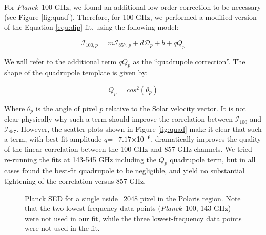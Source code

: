 \documentclass{emulateapj}
\newcommand{\PLANCK}{{\it Planck}}
\begin{document}
For \PLANCK~100 GHz, we found an additional low-order correction to be
necessary (see Figure \ref{fig:quad}). Therefore, for 100 GHz, we performed a 
modified version of the Equation \ref{equ:dip} fit, using the following model:

\begin{equation} \label{equ:quad}
\mathcal{I}_{100, p} = m\mathcal{I}_{857, p} + d\mathcal{D}_p + b + qQ_p
\end{equation}

We will refer to the additional term $qQ_p$ as the ``quadrupole correction''. 
The shape of the quadrupole template is given by:

\begin{equation}
Q_p = cos^2(\theta_p)
\end{equation}

Where $\theta_p$ is the angle of pixel $p$ relative to the Solar velocity 
vector. It is not clear physically why such a term should improve the 
correlation between $\mathcal{I}_{100}$ and $\mathcal{I}_{857}$. However, the 
scatter plots shown in Figure \ref{fig:quad} make it clear that such a term, 
with best-fit amplitude $q$=$-7.17$$\times$10$^{-6}$, dramatically improves the
quality of the linear correlation between the 100 GHz and 857 GHz channels. We 
tried re-running the fits at 143-545 GHz including the $Q_p$ quadrupole term, 
but in all cases found the best-fit quadrupole to be negligible, and yield no 
substantial tightening of the correlation versus 857 GHz.



\begin{figure}
\begin{center}
\caption{\label{fig:sed} Planck SED for a single nside=2048 pixel in the 
Polaris region. Note that the two lowest-frequency data points (\PLANCK~100, 
143 GHz) were not used in our fit, while the three lowest-frequency data
points were not used in the \cite{planckdust} fit.}
\end{center}
\end{figure}

\end{document}
